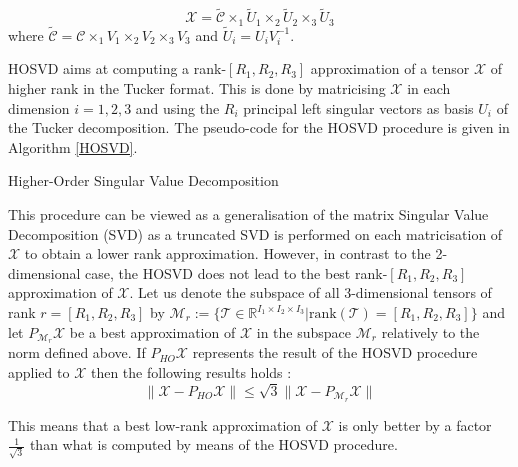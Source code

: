 \documentclass[a4paper, 11pt]{article} %
\makeatletter
\def \be {\begin{equation*}}
\def \ee {\end{equation*}}
\def \X {\mathcal{X}}
\def \R {\mathbb{R}}
\def \t {\times}
\def \rank{\mbox{rank}}
\def \C {\mathcal{C}}
\def \Mr {\mathcal{M}_{r}}
\def\BState{\State\hskip-\ALG@thistlm}
\makeatother
\begin{document}
\be
\X=\tilde{\C} \t_1 \tilde{U}_1 \t_2 \tilde{U}_2 \t_3 \tilde{U}_3 
\ee
where $\tilde{\C}=\C\t_1V_1 \t_2 V_2 \t_3 V_3$ and $\tilde{U}_i=U_iV_i^{-1}$.

HOSVD aims at computing a rank-$\left[R_1,R_2, R_3\right]$ approximation of a tensor $\X$ of higher rank in the Tucker format. This is done by matricising $\X$ in each dimension $i=1,2,3$ and using the $R_i$ principal left singular vectors as basis $U_i$ of the Tucker decomposition. The pseudo-code for the HOSVD procedure is given in Algorithm \autoref{HOSVD}.

\begin{algorithm}
\caption{Higher-Order Singular Value Decomposition}\label{HOSVD}
\end{algorithm}


This procedure can be viewed as a generalisation of the matrix Singular Value Decomposition (SVD) as a truncated SVD is performed on each matricisation of $\X$ to obtain a lower rank approximation. However, in contrast to the 2-dimensional case, the HOSVD does not lead to the best rank-$\left[R_1,R_2, R_3\right]$ approximation of $\X$. Let us denote the subspace of  all 3-dimensional tensors of rank $r=\left[R_1, R_2, R_3\right]$  by  $\Mr:=\{  \in \R^{I_1\t I_2 \t I_3} | \rank()=\left[R_1,R_2, R_3\right] \}$ and let $P_{\Mr}\X$ be a best approximation of $\X$ in the subspace $\Mr$ relatively to the norm defined above. If $P_{HO}\X$ represents the result of the HOSVD procedure applied to $\X$ then the following results holds \cite{GeomCG}:
\be
\|\X-P_{HO}\X \|\leqslant \sqrt{3} \| \X-P_{\Mr}\X \|
\ee

This means that a best low-rank approximation of $\X$  is only better by a factor $$ than what is computed by means of the HOSVD procedure.
\end{document}
